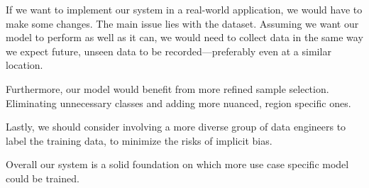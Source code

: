 If we want to implement our system in a real-world application, we would have to make some changes. The main issue lies with the dataset. Assuming we want our model to perform as well as it can, we would need to collect data in the same way we expect future, unseen data to be recorded—preferably even at a similar location.

Furthermore, our model would benefit from more refined sample selection. Eliminating unnecessary classes and adding more nuanced, region specific ones.

Lastly, we should consider involving a more diverse group of data engineers to label the training data, to minimize the risks of implicit bias.

Overall our system is a solid foundation on which more use case specific model could be trained.




